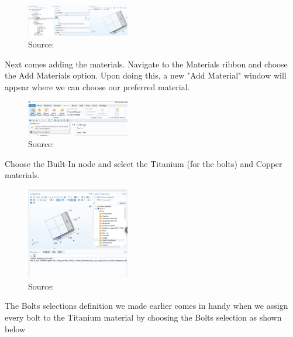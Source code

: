\begin{figure}[ht!]
  \centering
  \includegraphics[width=0.4\textwidth]{Chapters/Figures/Chapter 3 Figures/Bolts Selection.png}
  \caption{ Source: \cite{}}
  \label{}
\end{figure}

Next comes adding the materials. Navigate to the Materials ribbon and choose the Add Materials option. Upon doing this, a new "Add Material" window will appear where we can choose our preferred material.

\begin{figure}[ht!]
  \centering
  \includegraphics[width=0.4\textwidth]{Chapters/Figures/Chapter 3 Figures/Add Material Button.png}
  \caption{Source: \cite{}}
  \label{}
\end{figure}

Choose the Built-In node and select the Titanium (for the bolts) and Copper materials.

\begin{figure}[ht!]
  \centering
  \includegraphics[width=0.4\textwidth]{Chapters/Figures/Chapter 3 Figures/Add Material Window.png}
  \caption{Source: \cite{}}
  \label{}
\end{figure}

The Bolts selections definition we made earlier comes in handy when we assign every bolt to the Titanium material by choosing the Bolts selection as shown below

